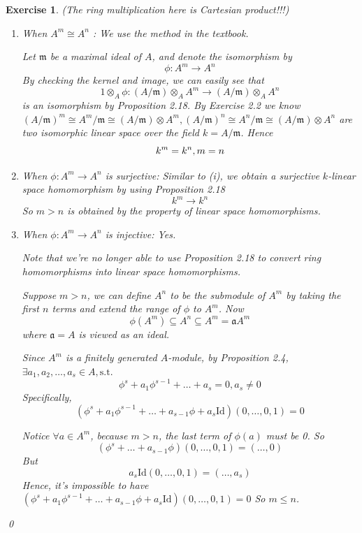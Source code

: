 \documentclass{article}
\theoremstyle{breakstyle}
\newtheorem{exercise}{Exercise}
\let\dim\relax
\DeclareMathOperator{\dim}{Dim}
\begin{document}
\begin{exercise}
    \emph{(The ring multiplication here is Cartesian product!!!)}
    \begin{enumerate}[label=({\roman*})]
        \item When $A^{m}\cong A^{n}$ :
            We use the method in the textbook.

            Let $\mathfrak{m}$ be a maximal ideal of $A$, and denote the isomorphism by
            $$
            \phi:A^{m}\longrightarrow A^{n}
            $$
            By checking the kernel and image, we can easily see that
            $$
            1\otimes _{A}\phi:(A / \mathfrak{m})\otimes _{A}A^{m}\longrightarrow (A / \mathfrak{m})\otimes _{A}A^{n}
            $$
            is an isomorphism by \emph{Proposition 2.18}.
            By \emph{Exercise 2.2} we know $\left( A / \mathfrak{m} \right) ^{m}\cong A^{m} / \mathfrak{m}\cong (A / \mathfrak{m})\otimes A^{m},\left( A / \mathfrak{m} \right) ^{n}\cong A^{n} / \mathfrak{m}\cong (A / \mathfrak{m})\otimes A^{n}$ are two isomorphic linear space over the field $k=A / \mathfrak{m}$.
            Hence
            $$
            \dim{k^{m}}=\dim{k^{n}},m=n
            $$
        \item When $\phi:A^{m}\longrightarrow A^{n}$ is surjective:
            Similar to \emph{(i)}, we obtain a surjective $k$-linear space homomorphism by using \emph{Proposition 2.18}
            $$
            k^{m}\longrightarrow k^{n}
            $$
            So $m>n$ is obtained by the property of linear space homomorphisms.
        \item When $\phi:A^{m}\longrightarrow A^{n}$ is injective:
            Yes.

            Note that we're no longer able to use \emph{Proposition 2.18} to convert ring homomorphisms into linear space homomorphisms.

            Suppose $m>n$, we can define $A^{n}$ to be the submodule of $A^{m}$ by taking the first $n$ terms and extend the range of $\phi$ to $A^{m}$.
            Now
            $$
            \phi(A^{m})\subseteq A^{n}\subseteq A^{m}=\mathfrak{a} A^m
            $$
            where $\mathfrak{a}=A$ is viewed as an ideal.

            Since $A^{m}$ is a finitely generated $A$-module, by \emph{Proposition 2.4}, $\exists a_1,a_2,\ldots ,a_{s}\in A,\text{s.t. }$
            $$
            \phi^{s}+a_{1}\phi^{s-1}+\ldots +a_{s}=0,a_{s}\neq 0
            $$
            Specifically,
            $$
            (\phi^{s}+a_1\phi^{s-1}+\ldots +a_{s-1}\phi+a_{s}\mathrm{Id})(0,\ldots ,0,1)=0
            $$
            
            Notice $\forall a\in A^{m}$, because $m>n$, the last term of $\phi(a)$ must be 0.
            So
            $$
            (\phi^{s}+\ldots +a_{s-1}\phi)(0,\ldots ,0,1)=(\ldots ,0)
            $$
            But
            $$
            a_{s}\mathrm{Id}(0,\ldots ,0,1)=(\ldots ,a_{s})
            $$
            Hence, it's impossible to have $(\phi^{s}+a_1\phi^{s-1}+\ldots +a_{s-1}\phi+a_{s}\mathrm{Id})(0,\ldots ,0,1)=0$
            So $m\le n$.
    \end{enumerate}
    \qed
\end{exercise}
\end{document}
